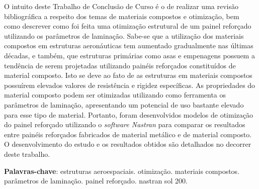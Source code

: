 \setlength{\absparsep}{18pt} %
\begin{resumo}

 O intuito deste Trabalho de Conclusão de Curso é o de realizar uma revisão bibliográfica a respeito dos temas de materiais compostos e otimização, bem como descrever como foi feita uma otimização estrutural de um painel reforçado utilizando os parâmetros de laminação. Sabe-se que a utilização dos materiais compostos em estruturas aeronáuticas tem aumentado gradualmente nas últimas décadas, e também, que estruturas primárias como asas e empenagens possuem a tendência de serem projetadas utilizando painéis reforçados constituídos de material composto. Isto se deve ao fato de as estruturas em materiais compostos possuírem elevados valores de resistência e rigidez específicas. As propriedades do material composto podem ser otimizadas utilizando como ferramenta os parâmetros de laminação, apresentando um potencial de uso bastante elevado para esse tipo de material. Portanto, foram desenvolvidos modelos de otimização do painel reforçado utilizando o \emph{software Nastran} para comparar os resultados entre painéis reforçados fabricados de material metálico e de material composto. O desenvolvimento do estudo e os resultados obtidos são detalhados no decorrer deste trabalho.


\textbf{Palavras-chave}: estruturas aeroespaciais. otimização. materiais compostos. parâmetros de laminação. painel reforçado. nastran sol 200.
\end{resumo}

